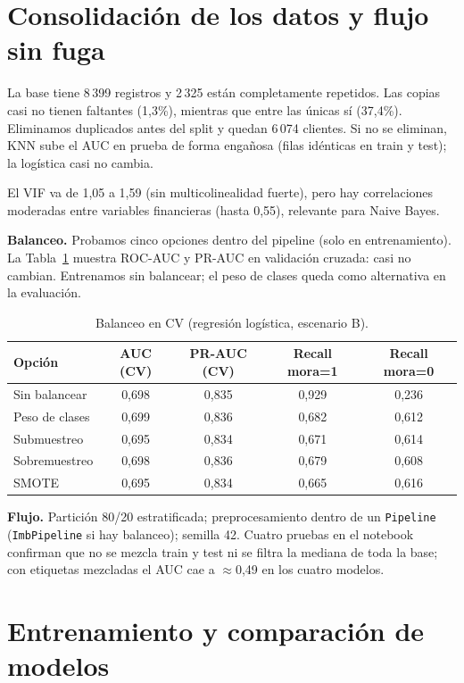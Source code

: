 \documentclass[11pt,a4paper]{article}
\begin{document}
\section{Consolidación de los datos y flujo sin fuga}

La base tiene 8\,399 registros y 2\,325 están completamente repetidos. Las copias casi no tienen faltantes (1,3\%), mientras que entre las únicas sí (37,4\%). Eliminamos duplicados antes del split y quedan 6\,074 clientes. Si no se eliminan, KNN sube el AUC en prueba de forma engañosa (filas idénticas en train y test); la logística casi no cambia.

El VIF va de 1,05 a 1,59 (sin multicolinealidad fuerte), pero hay correlaciones moderadas entre variables financieras (hasta 0,55), relevante para Naive Bayes.

\textbf{Balanceo.} Probamos cinco opciones dentro del pipeline (solo en entrenamiento). La Tabla~\ref{tab:balanceo} muestra ROC-AUC y PR-AUC en validación cruzada: casi no cambian. Entrenamos sin balancear; el peso de clases queda como alternativa en la evaluación.

\begin{table}[H]
  \centering
  \caption{Balanceo en CV (regresión logística, escenario B).}
  \label{tab:balanceo}
  \small
  \begin{tabular}{@{}lcccc@{}}
    \toprule
    Opción & AUC (CV) & PR-AUC (CV) & Recall mora=1 & Recall mora=0 \\
    \midrule
    Sin balancear & 0,698 & 0,835 & 0,929 & 0,236 \\
    Peso de clases & 0,699 & 0,836 & 0,682 & 0,612 \\
    Submuestreo & 0,695 & 0,834 & 0,671 & 0,614 \\
    Sobremuestreo & 0,698 & 0,836 & 0,679 & 0,608 \\
    SMOTE & 0,695 & 0,834 & 0,665 & 0,616 \\
    \bottomrule
  \end{tabular}
\end{table}

\textbf{Flujo.} Partición 80/20 estratificada; preprocesamiento dentro de un \texttt{Pipeline} (\texttt{ImbPipeline} si hay balanceo); semilla 42. Cuatro pruebas en el notebook confirman que no se mezcla train y test ni se filtra la mediana de toda la base; con etiquetas mezcladas el AUC cae a $\approx$0,49 en los cuatro modelos.

\section{Entrenamiento y comparación de modelos}
\end{document}
